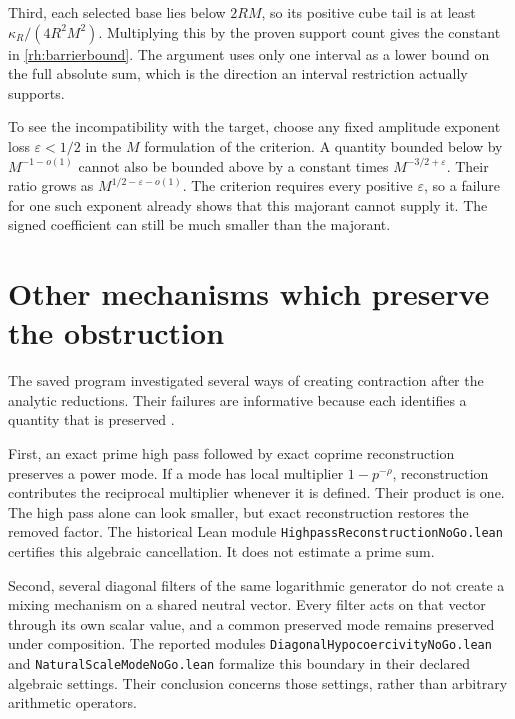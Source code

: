Third, each selected base lies below \(2RM\), so its positive cube tail is at least \(\kappa_R/(4R^2M^2)\). Multiplying this by the proven support count gives the constant in \eqref{rh:barrierbound}. The argument uses only one interval as a lower bound on the full absolute sum, which is the direction an interval restriction actually supports.

To see the incompatibility with the target, choose any fixed amplitude exponent loss \(\varepsilon<1/2\) in the \(M\) formulation of the criterion. A quantity bounded below by \(M^{-1-o(1)}\) cannot also be bounded above by a constant times \(M^{-3/2+\varepsilon}\). Their ratio grows as \(M^{1/2-\varepsilon-o(1)}\). The criterion requires every positive \(\varepsilon\), so a failure for one such exponent already shows that this majorant cannot supply it. The signed coefficient can still be much smaller than the majorant.


\section{Other mechanisms which preserve the obstruction}

The saved program investigated several ways of creating contraction after the analytic reductions. Their failures are informative because each identifies a quantity that is preserved \cite{KomorebiFinalGap,KomorebiBoundary}.

First, an exact prime high pass followed by exact coprime reconstruction preserves a power mode. If a mode has local multiplier \(1-p^{-\rho}\), reconstruction contributes the reciprocal multiplier whenever it is defined. Their product is one. The high pass alone can look smaller, but exact reconstruction restores the removed factor. The historical Lean module \texttt{HighpassReconstructionNoGo.lean} certifies this algebraic cancellation. It does not estimate a prime sum.

Second, several diagonal filters of the same logarithmic generator do not create a mixing mechanism on a shared neutral vector. Every filter acts on that vector through its own scalar value, and a common preserved mode remains preserved under composition. The reported modules \texttt{DiagonalHypocoercivityNoGo.lean} and \texttt{NaturalScaleModeNoGo.lean} formalize this boundary in their declared algebraic settings. Their conclusion concerns those settings, rather than arbitrary arithmetic operators.

